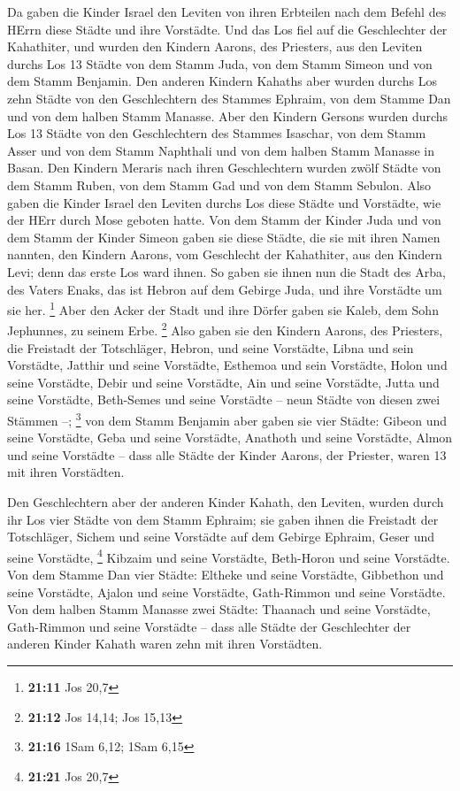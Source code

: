  Da gaben die Kinder Israel den Leviten von ihren
Erbteilen nach dem Befehl des HErrn diese Städte und ihre Vorstädte.
 Und das Los fiel auf die Geschlechter der Kahathiter, und
wurden den Kindern Aarons, des Priesters, aus den Leviten durchs Los 13
Städte von dem Stamm Juda, von dem Stamm Simeon und von dem Stamm
Benjamin.  Den anderen Kindern Kahaths aber wurden durchs
Los zehn Städte von den Geschlechtern des Stammes Ephraim, von dem
Stamme Dan und von dem halben Stamm Manasse.  Aber den
Kindern Gersons wurden durchs Los 13 Städte von den Geschlechtern des
Stammes Isaschar, von dem Stamm Asser und von dem Stamm Naphthali und
von dem halben Stamm Manasse in Basan.  Den Kindern
Meraris nach ihren Geschlechtern wurden zwölf Städte von dem Stamm
Ruben, von dem Stamm Gad und von dem Stamm Sebulon.  Also
gaben die Kinder Israel den Leviten durchs Los diese Städte und
Vorstädte, wie der HErr durch Mose geboten hatte.  Von dem
Stamm der Kinder Juda und von dem Stamm der Kinder Simeon gaben sie
diese Städte, die sie mit ihren Namen nannten,  den
Kindern Aarons, vom Geschlecht der Kahathiter, aus den Kindern Levi;
denn das erste Los ward ihnen.  So gaben sie ihnen nun
die Stadt des Arba, des Vaters Enaks, das ist Hebron auf dem Gebirge
Juda, und ihre Vorstädte um sie her. \footnote{\textbf{21:11} Jos 20,7}
 Aber den Acker der Stadt und ihre Dörfer gaben sie
Kaleb, dem Sohn Jephunnes, zu seinem Erbe. \footnote{\textbf{21:12} Jos
  14,14; Jos 15,13}  Also gaben sie den Kindern Aarons,
des Priesters, die Freistadt der Totschläger, Hebron, und seine
Vorstädte, Libna und sein Vorstädte,  Jatthir und seine
Vorstädte, Esthemoa und sein Vorstädte,  Holon und seine
Vorstädte, Debir und seine Vorstädte,  Ain und seine
Vorstädte, Jutta und seine Vorstädte, Beth-Semes und seine Vorstädte --
neun Städte von diesen zwei Stämmen --; \footnote{\textbf{21:16} 1Sam
  6,12; 1Sam 6,15}  von dem Stamm Benjamin aber gaben sie
vier Städte: Gibeon und seine Vorstädte, Geba und seine Vorstädte,
 Anathoth und seine Vorstädte, Almon und seine Vorstädte
--  dass alle Städte der Kinder Aarons, der Priester,
waren 13 mit ihren Vorstädten.

 Den Geschlechtern aber der anderen Kinder Kahath, den
Leviten, wurden durch ihr Los vier Städte von dem Stamm Ephraim;
 sie gaben ihnen die Freistadt der Totschläger, Sichem
und seine Vorstädte auf dem Gebirge Ephraim, Geser und seine Vorstädte,
\footnote{\textbf{21:21} Jos 20,7}  Kibzaim und seine
Vorstädte, Beth-Horon und seine Vorstädte.  Von dem
Stamme Dan vier Städte: Eltheke und seine Vorstädte, Gibbethon und seine
Vorstädte,  Ajalon und seine Vorstädte, Gath-Rimmon und
seine Vorstädte.  Von dem halben Stamm Manasse zwei
Städte: Thaanach und seine Vorstädte, Gath-Rimmon und seine Vorstädte --
 dass alle Städte der Geschlechter der anderen Kinder
Kahath waren zehn mit ihren Vorstädten.

